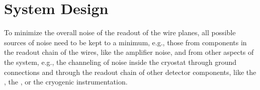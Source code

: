 \section{System Design}
\label{sec:fdsp-tpcelec-design}

\begin{comment}
In order to achieve the lowest possible overall noise in the readout of 
the \dword{apa} wire planes, all possible sources of noise need to be kept to a
minimum. This requires not only minimizing the noise sources in each
of the components of the readout chain of the \dword{apa} wires, like
the \dword{fe} amplifier noise. It also requires that all system aspects
are taken into account, including avoiding channeling noise inside
the cryostat through ground connections and through the readout
chain of other detector components, like the \dword{pds}, the \dword{hvs},
or the cryogenic instrumentation. In this Section we describe,the overall
system design of the \dword{ce}, starting in
\ref{sec:fdsp-tpcelec-design-grounding} with a description of the
grounding and shielding scheme adopted in the \dword{dune} \dword{spmod}
to minimize the overall noise in the detector, followed in
\ref{sec:fdsp-tpcelec-design-bias} by a discussion of the bias
voltage distribution system. Later, we describe in 
\ref{sec:fdsp-tpcelec-design-femb} the \dwords{femb}, including
the design of the \dwords{asic} that are being considered for
use in \dword{dune}. In~\ref{sec:fdsp-tpcelec-design-infrastructure}
we discuss the infrastructure for the \dword{ce} inside the cryostat,
that includes the cold boxes that shield the \dwords{femb}, the
cold cables, and the cables trays. Then in
\ref{sec:fdsp-tpcelec-design-ft}-\ref{sec:fdsp-tpcelec-design-timing} we discuss 
the infrastructure on the top of the cryostat, including the
feedthroughs, the \dwords{wiec}, the timing distribution and
synchronization system, and the services that provide the low
voltage power and the bias voltage to the \dword{ce}. Finally,
we conclude in~\ref{sec:fdsp-tpcelec-overview-remaining}
with a discussion of the design maturity and of
the remaining prototype activities that are required prior to
the beginning of he detector construction. Other aspects of
the system design, pertaining to the grounding of other 
detector components, are discussed in Section~\ref{sec:fdsp-tpcelec-interfaces}.
\end{comment}
To minimize the overall noise of the readout of the 
wire planes, all possible sources of noise need to be kept to a
minimum, e.g., those from  components in the readout chain of the  wires, like
the  amplifier noise, and from other aspects of the system, e.g., the  channeling of noise inside
the cryostat through ground connections and through the readout
chain of other detector components, like the , the ,
or the cryogenic instrumentation. 

